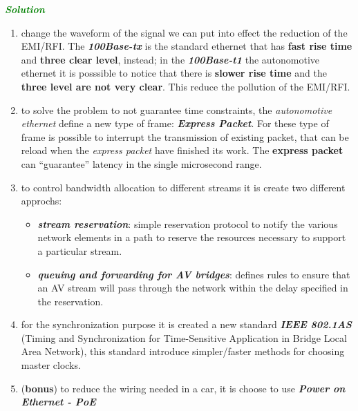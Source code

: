 \begin{boxA}
    \textcolor{green}{\textbf{\textit{Solution}}}
    \begin{enumerate}[nosep]
        \item change the waveform of the signal we can put into effect the reduction of the EMI/RFI. The \textbf{\textit{100Base-tx}} is the standard ethernet that has \textbf{fast rise time} and \textbf{three clear level}, instead; in the \textbf{\textit{100Base-t1}} the autonomotive ethernet it is posssible to notice that there is \textbf{slower rise time} and the \textbf{three level are not very clear}. This reduce the pollution of the EMI/RFI.
        \item to solve the problem to not guarantee time constraints, the \textit{autonomotive ethernet} define a new type of frame: \textbf{\textit{Express Packet}}. For these type of frame is possible to interrupt the transmission of existing packet, that can be reload when the \textit{express packet} have finished its work. The \textbf{express packet} can ``guarantee'' latency in the single microsecond range.
        \item to control bandwidth allocation to different streams it is create two different approchs:
        \begin{itemize}[nosep]
            \item \textbf{\textit{stream reservation}}: simple reservation protocol to notify the various network elements in a path to reserve the resources necessary to support a particular stream.
            \item \textbf{\textit{queuing and forwarding for AV bridges}}: defines rules to ensure that an AV stream will pass through the network within the delay specified in the reservation.
        \end{itemize}
        \item for the synchronization purpose it is created a new standard \textbf{\textit{IEEE 802.1AS}} (Timing and Synchronization for Time-Sensitive Application in Bridge Local Area Network), this standard introduce simpler/faster methods for choosing master clocks.
        \item (\textbf{bonus}) to reduce the wiring needed in a car, it is choose to use \textbf{\textit{Power on Ethernet - PoE}}
    \end{enumerate}
\end{boxA}